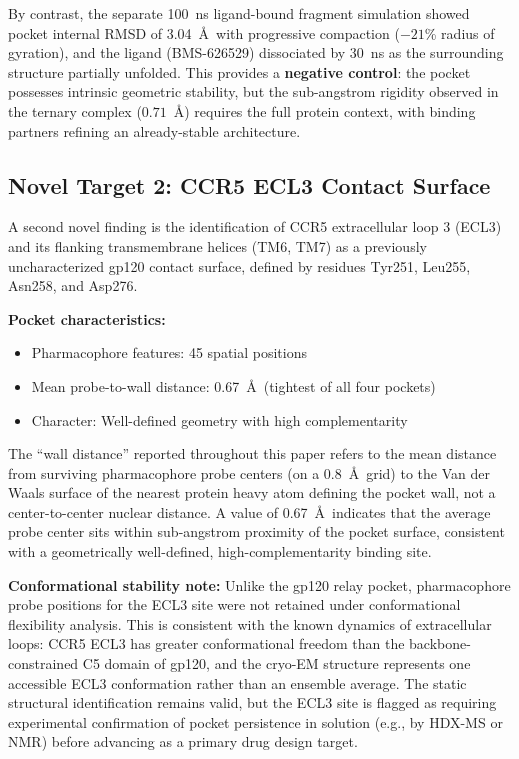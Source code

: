 \documentclass[11pt,a4paper]{article}
\begin{document}
By contrast, the separate 100~ns ligand-bound fragment simulation showed pocket internal RMSD of 3.04~\AA\ with progressive compaction ($-21$\% radius of gyration), and the ligand (BMS-626529) dissociated by 30~ns as the surrounding structure partially unfolded. This provides a \textbf{negative control}: the pocket possesses intrinsic geometric stability, but the sub-angstrom rigidity observed in the ternary complex ($0.71$~\AA) requires the full protein context, with binding partners refining an already-stable architecture.

\subsection{Novel Target 2: CCR5 ECL3 Contact Surface}

A second novel finding is the identification of CCR5 extracellular loop 3 (ECL3) and its flanking transmembrane helices (TM6, TM7) as a previously uncharacterized gp120 contact surface, defined by residues Tyr251, Leu255, Asn258, and Asp276.

\textbf{Pocket characteristics:}
\begin{itemize}[nosep,leftmargin=1.5em]
    \item Pharmacophore features: 45 spatial positions
    \item Mean probe-to-wall distance: 0.67~\AA\ (tightest of all four pockets)
    \item Character: Well-defined geometry with high complementarity
\end{itemize}

The ``wall distance'' reported throughout this paper refers to the mean distance from surviving pharmacophore probe centers (on a 0.8~\AA\ grid) to the Van der Waals surface of the nearest protein heavy atom defining the pocket wall, not a center-to-center nuclear distance. A value of 0.67~\AA\ indicates that the average probe center sits within sub-angstrom proximity of the pocket surface, consistent with a geometrically well-defined, high-complementarity binding site.

\textbf{Conformational stability note:} Unlike the gp120 relay pocket, pharmacophore probe positions for the ECL3 site were not retained under conformational flexibility analysis. This is consistent with the known dynamics of extracellular loops: CCR5 ECL3 has greater conformational freedom than the backbone-constrained C5 domain of gp120, and the cryo-EM structure represents one accessible ECL3 conformation rather than an ensemble average. The static structural identification remains valid, but the ECL3 site is flagged as requiring experimental confirmation of pocket persistence in solution (e.g., by HDX-MS or NMR) before advancing as a primary drug design target.
\end{document}
